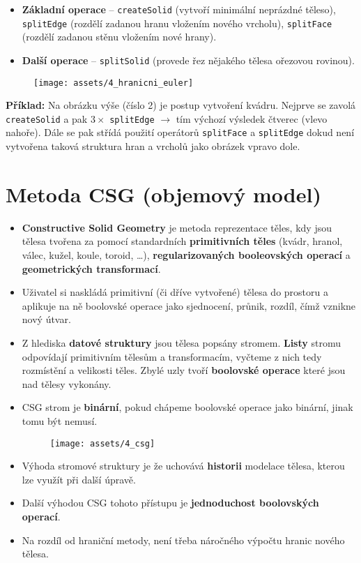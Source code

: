 \begin{itemize}
    \item \textbf{Základní operace} -- \texttt{createSolid} (vytvoří minimální neprázdné těleso), \texttt{splitEdge} (rozdělí zadanou hranu vložením nového vrcholu), \texttt{splitFace} (rozdělí zadanou stěnu vložením nové hrany).
    \item \textbf{Další operace} -- \texttt{splitSolid} (provede řez nějakého tělesa ořezovou rovinou).
\end{itemize}

\begin{figure}[H]
    \centering
    \texttt{[image: assets/4\_hranicni\_euler]}
\end{figure}

\textbf{Příklad:} Na obrázku výše (číslo 2) je postup vytvoření kvádru. Nejprve se zavolá \texttt{createSolid} a pak $3 \times$ \texttt{splitEdge} $\rightarrow$ tím výchozí výsledek čtverec (vlevo nahoře). Dále se pak střídá použití operátorů \texttt{splitFace} a \texttt{splitEdge} dokud není vytvořena taková struktura hran a vrcholů jako obrázek vpravo dole.

\section{Metoda CSG (objemový model)}
\begin{itemize}
    \item \textbf{Constructive Solid Geometry} je metoda reprezentace těles, kdy jsou tělesa tvořena za pomocí standardních \textbf{primitivních těles} (kvádr, hranol, válec, kužel, koule, toroid, …), \textbf{regularizovaných booleovských operací} a \textbf{geometrických transformací}.
    \item Uživatel si naskládá primitivní (či dříve vytvořené) tělesa do prostoru a aplikuje na ně boolovské operace jako sjednocení, průnik, rozdíl, čímž vznikne nový útvar.
    \item Z hlediska \textbf{datové struktury} jsou tělesa popsány stromem. \textbf{Listy} stromu odpovídají primitivním tělesům a transformacím, vyčteme z nich tedy rozmístění a velikosti těles. Zbylé uzly tvoří \textbf{boolovské operace} které jsou nad tělesy vykonány.
    \item CSG strom je \textbf{binární}, pokud chápeme boolovské operace jako binární, jinak tomu být nemusí.
          \begin{figure}[H]
              \centering
              \texttt{[image: assets/4\_csg]}
          \end{figure}
    \item Výhoda stromové struktury je že uchovává \textbf{historii} modelace tělesa, kterou lze využít při další úpravě.
    \item Další výhodou CSG tohoto přístupu je \textbf{jednoduchost boolovských operací}.
    \item Na rozdíl od hraniční metody, není třeba náročného výpočtu hranic nového tělesa.
\end{itemize}

